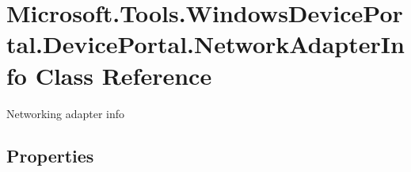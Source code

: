 \hypertarget{class_microsoft_1_1_tools_1_1_windows_device_portal_1_1_device_portal_1_1_network_adapter_info}{}\section{Microsoft.\+Tools.\+Windows\+Device\+Portal.\+Device\+Portal.\+Network\+Adapter\+Info Class Reference}
\label{class_microsoft_1_1_tools_1_1_windows_device_portal_1_1_device_portal_1_1_network_adapter_info}


Networking adapter info  


\subsection*{Properties}
